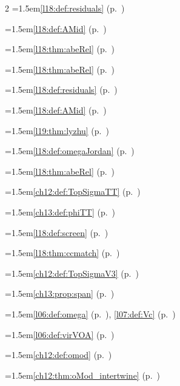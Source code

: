 \begin{multicols}{2}
\hangindent=1.5em\quad \ref{l18:def:residuals} (p.~\pageref{l18:def:residuals})\par
\hangindent=1.5em\quad \ref{l18:def:AMid} (p.~\pageref{l18:def:AMid})\par
\hangindent=1.5em\quad \ref{l18:thm:abeRel} (p.~\pageref{l18:thm:abeRel})\par
\hangindent=1.5em\quad \ref{l18:thm:abeRel} (p.~\pageref{l18:thm:abeRel})\par
\hangindent=1.5em\quad \ref{l18:def:residuals} (p.~\pageref{l18:def:residuals})\par
\hangindent=1.5em\quad \ref{l18:def:AMid} (p.~\pageref{l18:def:AMid})\par
\hangindent=1.5em\quad \ref{l19:thm:lyzhu} (p.~\pageref{l19:thm:lyzhu})\par
\hangindent=1.5em\quad \ref{l18:def:omegaJordan} (p.~\pageref{l18:def:omegaJordan})\par
\hangindent=1.5em\quad \ref{l18:thm:abeRel} (p.~\pageref{l18:thm:abeRel})\par
\hangindent=1.5em\quad \ref{ch12:def:TopSigmaTT} (p.~\pageref{ch12:def:TopSigmaTT})\par
\hangindent=1.5em\quad \ref{ch13:def:phiTT} (p.~\pageref{ch13:def:phiTT})\par
\hangindent=1.5em\quad \ref{l18:def:screen} (p.~\pageref{l18:def:screen})\par
\hangindent=1.5em\quad \ref{l18:thm:ccmatch} (p.~\pageref{l18:thm:ccmatch})\par
\hangindent=1.5em\quad \ref{ch12:def:TopSigmaV3} (p.~\pageref{ch12:def:TopSigmaV3})\par
\hangindent=1.5em\quad \ref{ch13:prop:span} (p.~\pageref{ch13:prop:span})\par
\hangindent=1.5em\quad \ref{l06:def:omega} (p.~\pageref{l06:def:omega}), \ref{l07:def:Vc} (p.~\pageref{l07:def:Vc})\par
\hangindent=1.5em\quad \ref{l06:def:virVOA} (p.~\pageref{l06:def:virVOA})\par
\hangindent=1.5em\quad \ref{ch12:def:omod} (p.~\pageref{ch12:def:omod})\par
\hangindent=1.5em\quad \ref{ch12:thm:oMod_intertwine} (p.~\pageref{ch12:thm:oMod_intertwine})\par

\end{multicols}
